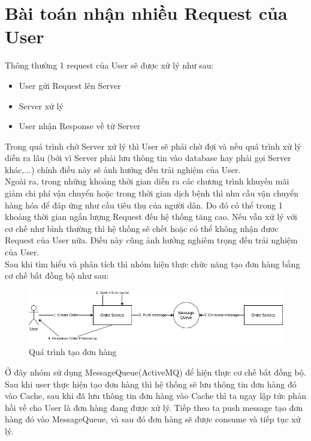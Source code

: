 		
		\section{Bài toán nhận nhiều Request của User}
		Thông thường 1 request của User sẽ được xử lý như sau: 
		
		    \begin{itemize}
                \item User gửi Request lên Server
                \item Server xử lý
                \item User nhận Response về từ Server 
            \end{itemize}
        
        Trong quá trình chờ Server xử lý thì User sẽ phải chờ đợi và nếu quá trình xử lý diễn ra lâu (bởi vì Server phải lưu thông tin vào database hay phải gọi Server khác,...) chính điều này sẽ ảnh hưởng đến trải nghiệm của User.\\
        
        Ngoài ra, trong những khoảng thời gian diễn ra các chương trình khuyến mãi giảm chi phí vận chuyển hoặc trong thời gian dịch bệnh thì nhu cầu vận chuyển hàng hóa để đáp ứng như cầu tiêu thụ của người dân. Do đó có thể trong 1 khoảng thời gian ngắn lượng Request đến hệ thống tăng cao. Nếu vẫn xử lý với cơ chế như bình thường thì hệ thống sẽ chết hoặc có thể không nhận đươc Request của User nữa. Điều này cũng ảnh hưởng nghiêm trọng đến trải nghiệm của User.\\
        
        Sau khi tìm hiểu và phân tích thì nhóm hiện thực chức năng tạo đơn hàng bằng cơ chế bất đồng bộ như sau:\\
        
        \begin{figure}[H]
			\includegraphics[width=1\textwidth]{Images/problem1.jpg}
			\centering
			\linebreak
			\caption{Quá trình tạo đơn hàng}
		\end{figure}
        
        Ở đây nhóm sử dụng MessageQueue(ActiveMQ) để hiện thực cơ chế bất đồng bộ. Sau khi user thực hiện tạo đơn hàng thì hệ thống sẽ lưu thông tin đơn hàng đó vào Cache, sau khi đã lưu thông tin đơn hàng vào Cache thì ta ngay lập tức phản hồi về cho User là đơn hàng đang được xử lý. Tiếp theo ta push message tạo đơn hàng đó vào MessageQueue, và sau đó đơn hàng sẽ được consume và tiếp tục xử lý.\\
        
